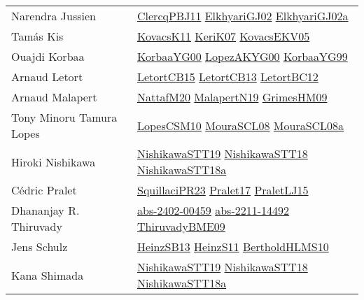 {\begin{longtable}{p{4cm}p{20cm}}
Narendra Jussien & \href{papers/ClercqPBJ11.pdf}{ClercqPBJ11}\cite{ClercqPBJ11} \href{papers/ElkhyariGJ02.pdf}{ElkhyariGJ02}\cite{ElkhyariGJ02} \href{papers/ElkhyariGJ02a.pdf}{ElkhyariGJ02a}\cite{ElkhyariGJ02a} \\
Tam{\'{a}}s Kis & \href{articles/KovacsK11.pdf}{KovacsK11}\cite{KovacsK11} \href{papers/KeriK07.pdf}{KeriK07}\cite{KeriK07} \href{papers/KovacsEKV05.pdf}{KovacsEKV05}\cite{KovacsEKV05} \\
Ouajdi Korbaa & \href{articles/KorbaaYG00.pdf}{KorbaaYG00}\cite{KorbaaYG00} \href{articles/LopezAKYG00.pdf}{LopezAKYG00}\cite{LopezAKYG00} \href{papers/KorbaaYG99.pdf}{KorbaaYG99}\cite{KorbaaYG99} \\
Arnaud Letort & \href{articles/LetortCB15.pdf}{LetortCB15}\cite{LetortCB15} \href{papers/LetortCB13.pdf}{LetortCB13}\cite{LetortCB13} \href{papers/LetortBC12.pdf}{LetortBC12}\cite{LetortBC12} \\
Arnaud Malapert & \href{papers/NattafM20.pdf}{NattafM20}\cite{NattafM20} \href{papers/MalapertN19.pdf}{MalapertN19}\cite{MalapertN19} \href{papers/GrimesHM09.pdf}{GrimesHM09}\cite{GrimesHM09} \\
Tony Minoru Tamura Lopes & \href{articles/LopesCSM10.pdf}{LopesCSM10}\cite{LopesCSM10} \href{papers/MouraSCL08.pdf}{MouraSCL08}\cite{MouraSCL08} \href{papers/MouraSCL08a.pdf}{MouraSCL08a}\cite{MouraSCL08a} \\
Hiroki Nishikawa & \href{}{NishikawaSTT19}\cite{NishikawaSTT19} \href{papers/NishikawaSTT18.pdf}{NishikawaSTT18}\cite{NishikawaSTT18} \href{papers/NishikawaSTT18a.pdf}{NishikawaSTT18a}\cite{NishikawaSTT18a} \\
C{\'{e}}dric Pralet & \href{papers/SquillaciPR23.pdf}{SquillaciPR23}\cite{SquillaciPR23} \href{papers/Pralet17.pdf}{Pralet17}\cite{Pralet17} \href{papers/PraletLJ15.pdf}{PraletLJ15}\cite{PraletLJ15} \\
Dhananjay R. Thiruvady & \href{articles/abs-2402-00459.pdf}{abs-2402-00459}\cite{abs-2402-00459} \href{articles/abs-2211-14492.pdf}{abs-2211-14492}\cite{abs-2211-14492} \href{papers/ThiruvadyBME09.pdf}{ThiruvadyBME09}\cite{ThiruvadyBME09} \\
Jens Schulz & \href{articles/HeinzSB13.pdf}{HeinzSB13}\cite{HeinzSB13} \href{papers/HeinzS11.pdf}{HeinzS11}\cite{HeinzS11} \href{papers/BertholdHLMS10.pdf}{BertholdHLMS10}\cite{BertholdHLMS10} \\
Kana Shimada & \href{}{NishikawaSTT19}\cite{NishikawaSTT19} \href{papers/NishikawaSTT18.pdf}{NishikawaSTT18}\cite{NishikawaSTT18} \href{papers/NishikawaSTT18a.pdf}{NishikawaSTT18a}\cite{NishikawaSTT18a} \\

\end{longtable}}
